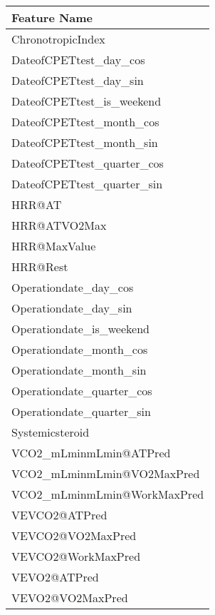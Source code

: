 \documentclass{article}
\begin{document}
\begin{table}[ht]  %
    \centering
    \begin{tabular}{|l|}
        \hline
        \textbf{Feature Name}           \\
        \hline
        ChronotropicIndex               \\
        DateofCPETtest\_day\_cos        \\
        DateofCPETtest\_day\_sin        \\
        DateofCPETtest\_is\_weekend     \\
        DateofCPETtest\_month\_cos      \\
        DateofCPETtest\_month\_sin      \\
        DateofCPETtest\_quarter\_cos    \\
        DateofCPETtest\_quarter\_sin    \\
        HRR@AT                          \\
        HRR@ATVO2Max                    \\
        HRR@MaxValue                    \\
        HRR@Rest                        \\
        Operationdate\_day\_cos         \\
        Operationdate\_day\_sin         \\
        Operationdate\_is\_weekend      \\
        Operationdate\_month\_cos       \\
        Operationdate\_month\_sin       \\
        Operationdate\_quarter\_cos     \\
        Operationdate\_quarter\_sin     \\
        Systemicsteroid                 \\
        VCO2\_mLminmLmin@ATPred         \\
        VCO2\_mLminmLmin@VO2MaxPred     \\
        VCO2\_mLminmLmin@WorkMaxPred    \\
        VEVCO2@ATPred                   \\
        VEVCO2@VO2MaxPred               \\
        VEVCO2@WorkMaxPred              \\
        VEVO2@ATPred                    \\
        VEVO2@VO2MaxPred                \\

\end{tabular}
\end{table}
\end{document}
